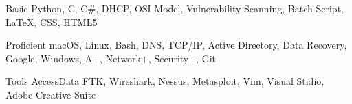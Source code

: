 

\begin{cvhonors}

  \cvhonor
    {Basic} %
    {Python, C, C\#, DHCP, OSI Model, Vulnerability Scanning, Batch Script, \LaTeX, CSS, HTML5} %

  \cvhonor
    {Proficient} %
    {macOS, Linux, Bash, DNS, TCP/IP, Active Directory, Data Recovery, Google, Windows, A+, Network+, Security+, Git} %

  \cvhonor
    {Tools} %
    {AccessData FTK, Wireshark, Nessus, Metasploit, Vim, Visual Stidio, Adobe Creative Suite} %


\end{cvhonors}